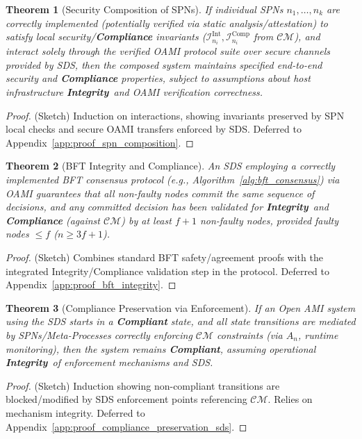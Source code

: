 \documentclass[12pt,a4paper]{report}
\newtheorem{theorem}{Theorem}[section]
\newcommand{\Integrity}{\textbf{Integrity}}
\begin{document}
	\begin{theorem}[Security Composition of SPNs]
		\label{thm:spn_composition_security}
		If individual SPNs $n_1, \dots, n_k$ are correctly implemented (potentially verified via static analysis/attestation) to satisfy local security/\textbf{Compliance} invariants ($\mathcal{I}_{n_i}^{\text{Int}}, \mathcal{I}_{n_i}^{\text{Comp}}$ from $\mathcal{CM}$), and interact solely through the verified OAMI protocol suite over secure channels provided by SDS, then the composed system maintains specified end-to-end security and \textbf{Compliance} properties, subject to assumptions about host infrastructure \Integrity\ and OAMI verification correctness.
	\end{theorem}
	\begin{proof} (Sketch) Induction on interactions, showing invariants preserved by SPN local checks and secure OAMI transfers enforced by SDS. Deferred to Appendix~\ref{app:proof_spn_composition}. \end{proof}
	
	\begin{theorem}[BFT Integrity and Compliance]
		\label{thm:bft_integrity_compliance}
		An SDS employing a correctly implemented BFT consensus protocol (e.g., Algorithm~\ref{alg:bft_consensus}) via OAMI guarantees that all non-faulty nodes commit the same sequence of decisions, and any committed decision has been validated for \Integrity\ and \textbf{Compliance} (against $\mathcal{CM}$) by at least $f+1$ non-faulty nodes, provided faulty nodes $\le f$ ($n \ge 3f+1$).
	\end{theorem}
	\begin{proof} (Sketch) Combines standard BFT safety/agreement proofs with the integrated Integrity/Compliance validation step in the protocol. Deferred to Appendix~\ref{app:proof_bft_integrity}. \end{proof}
	
	\begin{theorem}[Compliance Preservation via Enforcement]
		\label{thm:compliance_preservation_sds}
		If an Open AMI system using the SDS starts in a \textbf{Compliant} state, and all state transitions are mediated by SPNs/Meta-Processes correctly enforcing $\mathcal{CM}$ constraints (via $A_n$, runtime monitoring), then the system remains \textbf{Compliant}, assuming operational \Integrity\ of enforcement mechanisms and SDS.
	\end{theorem}
	\begin{proof} (Sketch) Induction showing non-compliant transitions are blocked/modified by SDS enforcement points referencing $\mathcal{CM}$. Relies on mechanism integrity. Deferred to Appendix~\ref{app:proof_compliance_preservation_sds}. \end{proof}
	
\end{document}

